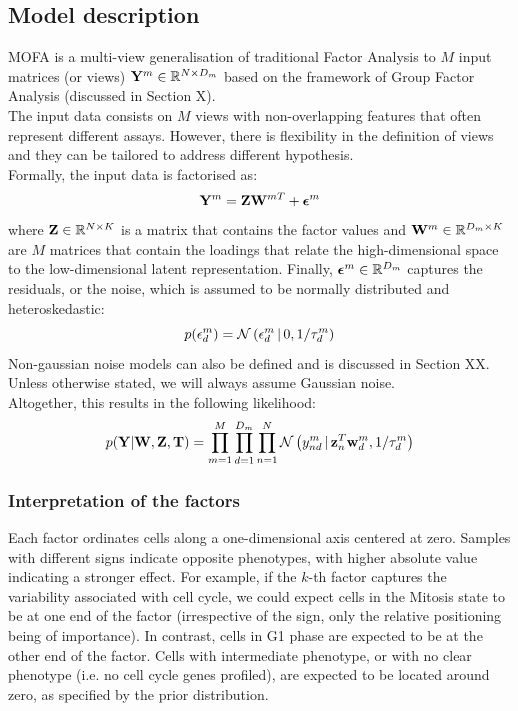 \subsection{Model description}
MOFA is a multi-view generalisation of traditional Factor Analysis to $M$ input matrices (or views) ${\bf Y}^m \in \mathbb{R}^{N \times D_m}$ based on the framework of Group Factor Analysis (discussed in Section X).\\
The input data consists on $M$ views with non-overlapping features that often represent different assays. However, there is flexibility in the definition of views and they can be tailored to address different hypothesis.\\
Formally, the input data is factorised as:
\begin{equation}
	\mathbf{Y}^m = \mathbf{Z}\mathbf{W}^{mT} + \mbox{\boldmath $\epsilon$}^m
\end{equation}
where ${\bf Z} \in \mathbb{R}^{N \times K}$ is a matrix that contains the factor values and ${\bf W}^m \in \mathbb{R}^{D_m \times K}$ are $M$ matrices that contain the loadings that relate the high-dimensional space to the low-dimensional latent representation. Finally, $\mbox{\boldmath $\epsilon$}^m \in \mathbb{R}^{D_m}$ captures the residuals, or the noise, which is assumed to be normally distributed and heteroskedastic:
\begin{equation}
	p(\epsilon^m_d) = \mathcal{N}\left(\epsilon^m_d \,|\, 0,1/\tau_d^m\right)
\end{equation}
Non-gaussian noise models can also be defined and is discussed in Section XX. Unless otherwise stated, we will always assume Gaussian noise.\\
Altogether, this results in the following likelihood:
\begin{equation}
	p({\bf Y}|{\bf W},{\bf Z},\mbox{\boldmath $\mathrm{T}$}) = \prod_{m=1}^{M} \prod_{d=1}^{D_m} \prod_{n=1}^{N} \mathcal{N}\left(y_{nd}^m \,|\, {\bf z}_{n}^T{\bf w}_{d}^{m},1/\tau_d^m\right)
\end{equation}

\subsubsection{Interpretation of the factors}
Each factor ordinates cells along a one-dimensional axis centered at zero. Samples with different signs indicate opposite phenotypes, with higher absolute value indicating a stronger effect. For example, if the $k$-th factor captures the variability associated with cell cycle, we could expect cells in the Mitosis state to be at one end of the factor (irrespective of the sign, only the relative positioning being of importance). In contrast, cells in G1 phase are expected to be at the other end of the factor. Cells with intermediate phenotype, or with no clear phenotype (i.e. no cell cycle genes profiled), are expected to be located around zero, as specified by the prior distribution.

